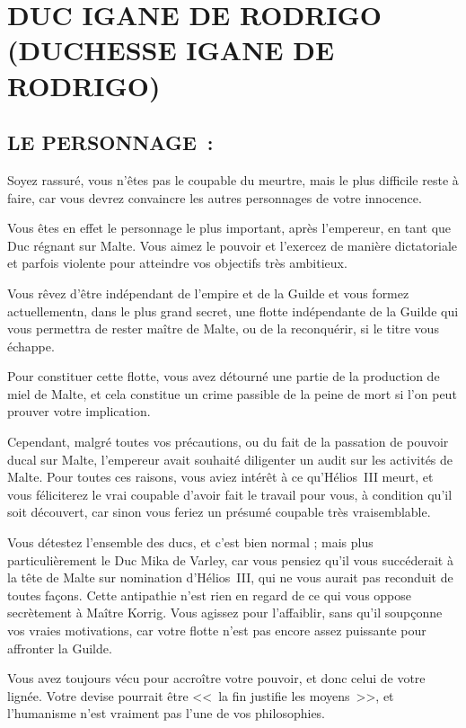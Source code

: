 \documentclass[14pt,twocolumn]{extarticle}
\begin{document}
\section{DUC IGANE DE RODRIGO\\(DUCHESSE IGANE DE RODRIGO)}

\subsection{LE PERSONNAGE~:}

Soyez rassuré, vous n'êtes pas le coupable du meurtre, mais le plus difficile
reste à faire, car vous devrez convaincre les autres personnages de votre
innocence.

Vous êtes en effet le personnage le plus important, après l'empereur, en tant
que Duc régnant sur Malte. Vous aimez le pouvoir et l'exercez de manière
dictatoriale et parfois violente pour atteindre vos objectifs très ambitieux.

Vous rêvez d'être indépendant de l'empire et de la Guilde et vous formez
actuellementn, dans le plus grand secret, une flotte indépendante de la Guilde
qui vous permettra de rester maître de Malte, ou de la reconquérir, si le titre
vous échappe.

Pour constituer cette flotte, vous avez détourné une partie de la production de
miel de Malte, et cela constitue un crime passible de la peine de mort si l'on
peut prouver votre implication.

Cependant, malgré toutes vos précautions, ou du fait de la passation de pouvoir
ducal sur Malte, l'empereur avait souhaité diligenter un audit sur les
activités de Malte. Pour toutes ces raisons, vous aviez intérêt à ce
qu'Hélios~III meurt, et vous féliciterez le vrai coupable d'avoir fait le
travail pour vous, à condition qu'il soit découvert, car sinon vous feriez un
présumé coupable très vraisemblable.

Vous détestez l'ensemble des ducs, et c'est bien normal ; mais plus
particulièrement le Duc Mika de Varley, car vous pensiez qu'il vous succéderait
à la tête de Malte sur nomination d'Hélios~III, qui ne vous aurait pas
reconduit de toutes façons. Cette antipathie n'est rien en regard de ce qui
vous oppose secrètement à Maître Korrig. Vous agissez pour l'affaiblir, sans
qu'il soupçonne vos vraies motivations, car votre flotte n'est pas encore assez
puissante pour affronter la Guilde.

Vous avez toujours vécu pour accroître votre pouvoir, et donc celui de votre
lignée. Votre devise pourrait être <<~la fin justifie les moyens~>>, et
l'humanisme n'est vraiment pas l'une de vos philosophies.
\end{document}

